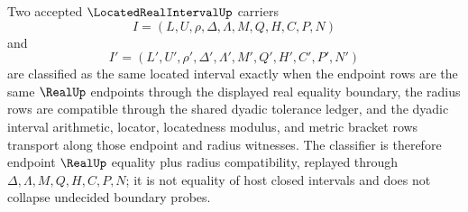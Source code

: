 \begin{definition}
\label{def:located-real-interval-classifier}
Two accepted $\LocatedRealIntervalUp$ carriers
$$
I=(L,U,\rho,\Delta,\Lambda,M,Q,H,C,P,N)
$$
and
$$
I'=(L',U',\rho',\Delta',\Lambda',M',Q',H',C',P',N')
$$
are classified as the same located interval exactly when the endpoint rows are the same $\RealUp$ endpoints through the displayed real equality boundary, the radius rows are compatible through the shared dyadic tolerance ledger, and the dyadic interval arithmetic, locator, locatedness modulus, and metric bracket rows transport along those endpoint and radius witnesses. The classifier is therefore endpoint $\RealUp$ equality plus radius compatibility, replayed through $\Delta,\Lambda,M,Q,H,C,P,N$; it is not equality of host closed intervals and does not collapse undecided boundary probes.
\end{definition}

